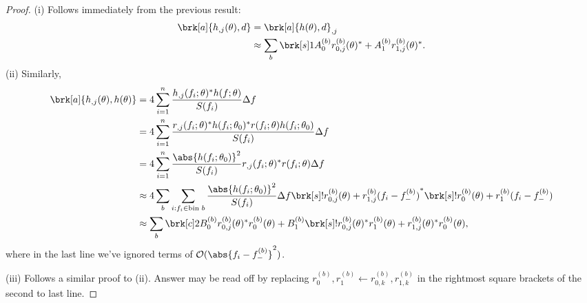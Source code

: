 \begin{proof}
(i) Follows immediately from the previous result:
\begin{align*}
\brk[a]{h_{,j}(\theta), d} &= \brk[a]{h(\theta), d}_{,j} \\
&\approx \sum_b \brk[s]1{A_0^{(b)} r_{0,j}^{(b)}(\theta)^* + A_1^{(b)} r_{1,j}^{(b)}(\theta)^*}.
\end{align*}
(ii) Similarly,
\begin{align*}
\brk[a]{h_{,j}(\theta), h(\theta)} &= 4 \sum_{i=1}^n \frac{h_{,j}(f_i;\theta)^* h(f;\theta)}{S(f_i)} \Delta f \\
&= 4 \sum_{i=1}^n \frac{r_{,j}(f_i;\theta)^* h(f_i;\theta_0)^* r(f_i;\theta) h(f_i;\theta_0)}{S(f_i)} \Delta f \\
&= 4 \sum_{i=1}^n \frac{\abs{h(f_i;\theta_0)}^2}{S(f_i)}  r_{,j}(f_i;\theta)^* r(f_i;\theta) \Delta f\\
&\approx 4 \sum_b \sum_{i:f_i \in \text{bin } b}\frac{\abs{h(f_i;\theta_0)}^2}{S(f_i)}\Delta f \brk[s]!{r_{0,j}^{(b)}(\theta) + r_{1,j}^{(b)}(f_i-f_-^{(b)})}^* \brk[s]!{r_{0}^{(b)}(\theta) + r_{1}^{(b)}(f_i-f_-^{(b)})} \\
&\approx \sum_b \brk[c]2{B_0^{(b)} r_{0,j}^{(b)}(\theta)^* r_0^{(b)}(\theta) + B_1^{(b)} \brk[s]!{r_{0,j}^{(b)}(\theta)^* r_1^{(b)}(\theta) + r_{1,j}^{(b)}(\theta)^* r_0^{(b)}(\theta)}},
\end{align*}
where in the last line we've ignored terms of $\order(\abs{f_i - f_-^{(b)}}^2)$.

(iii) Follows a similar proof to (ii). Answer may be read off by replacing $r_0^{(b)}, r_1^{(b)} \leftarrow r_{0,k}^{(b)}, r_{1,k}^{(b)}$ in the rightmost square brackets of the second to last line.
\end{proof}


